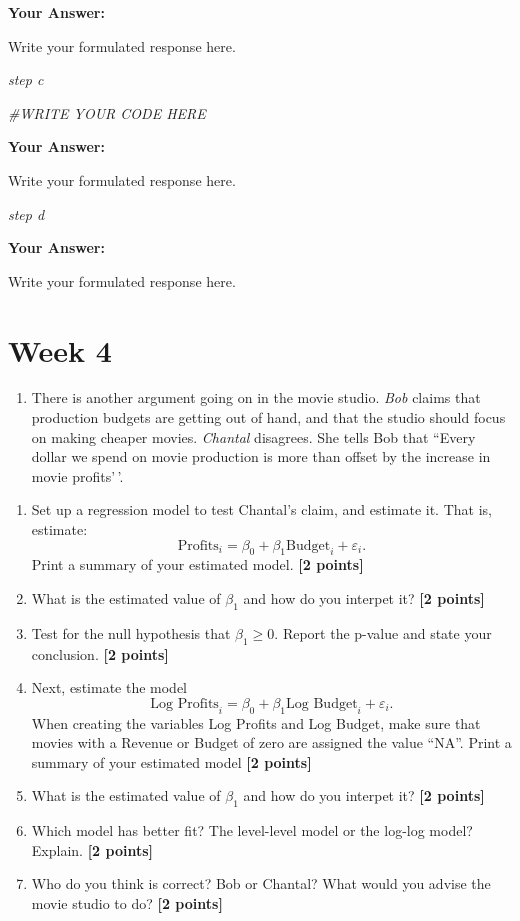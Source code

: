 \documentclass[
]{article}
\newenvironment{Shaded}{\begin{snugshade}}{\end{snugshade}}
\newcommand{\CommentTok}[1]{\textcolor[rgb]{0.56,0.35,0.01}{\textit{#1}}}
\providecommand{\tightlist}{%
  \setlength{\itemsep}{0pt}\setlength{\parskip}{0pt}}
\begin{document}
\textbf{Your Answer:}

Write your formulated response here.

\emph{step c}

\begin{Shaded}
\begin{Highlighting}[]
\CommentTok{\#WRITE YOUR CODE HERE}
\end{Highlighting}
\end{Shaded}

\textbf{Your Answer:}

Write your formulated response here.

\emph{step d}

\textbf{Your Answer:}

Write your formulated response here.

\section{Week 4}\label{week-4}

\begin{enumerate}
\def\labelenumi{\arabic{enumi}.}
\tightlist
\item
  There is another argument going on in the movie studio. \emph{Bob}
  claims that production budgets are getting out of hand, and that the
  studio should focus on making cheaper movies. \emph{Chantal}
  disagrees. She tells Bob that ``Every dollar we spend on movie
  production is more than offset by the increase in movie profits'\,'.
\end{enumerate}

\begin{enumerate}
\def\labelenumi{\alph{enumi}.}
\tightlist
\item
  Set up a regression model to test Chantal's claim, and estimate it.
  That is, estimate:
  \[\text{Profits}_i=\beta_0+\beta_1 \text{Budget}_i +\varepsilon_i.\]
  Print a summary of your estimated model. \textbf{[2 points]}
\item
  What is the estimated value of \(\beta_1\) and how do you interpet it?
  \textbf{[2 points]}
\item
  Test for the null hypothesis that \(\beta_1 \geq 0\). Report the
  p-value and state your conclusion. \textbf{[2 points]}
\item
  Next, estimate the model
  \[\text{Log Profits}_i=\beta_0+\beta_1 \text{Log Budget}_i +\varepsilon_i.\]
  When creating the variables Log Profits and Log Budget, make sure that
  movies with a Revenue or Budget of zero are assigned the value ``NA''.
  Print a summary of your estimated model \textbf{[2 points]}
\item
  What is the estimated value of \(\beta_1\) and how do you interpet it?
  \textbf{[2 points]}
\item
  Which model has better fit? The level-level model or the log-log
  model? Explain. \textbf{[2 points]}
\item
  Who do you think is correct? Bob or Chantal? What would you advise the
  movie studio to do? \textbf{[2 points]}
\end{enumerate}
\end{document}
